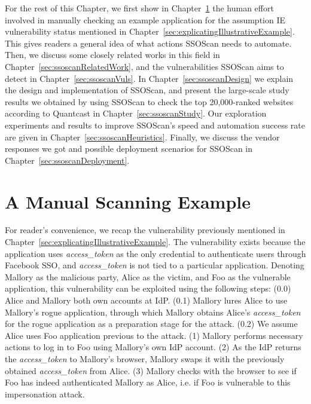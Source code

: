 For the rest of this Chapter, we first show in Chapter~\ref{sec:ssoscanManualExample} the human effort involved in manually checking an example application for the assumption IE vulnerability status mentioned in Chapter~\ref{sec:explicatingIllustrativeExample}.  This gives readers a general idea of what actions SSOScan needs to automate.  Then, we discuss some closely related works in this field in Chapter~\ref{sec:ssoscanRelatedWork}, and the vulnerabilities SSOScan aims to detect in Chapter~\ref{sec:ssoscanVuls}.  In Chapter~\ref{sec:ssoscanDesign} we explain the design and implementation of SSOScan, and present the large-scale study results we obtained by using SSOScan to check the top 20,000-ranked websites according to Quantcast in Chapter~\ref{sec:ssoscanStudy}.  Our exploration experiments and results to improve SSOScan's speed and automation success rate are given in Chapter~\ref{sec:ssoscanHeuristics}.  Finally, we discuss the vendor responses we got and possible deployment scenarios for SSOScan in Chapter~\ref{sec:ssoscanDeployment}.

\section{A Manual Scanning Example}
\label{sec:ssoscanManualExample}

For reader's convenience, we recap the vulnerability previously mentioned in Chapter~\ref{sec:explicatingIllustrativeExample}.  The vulnerability exists because the application uses \emph{access\_token} as the only credential to authenticate users through Facebook SSO, and \emph{access\_token} is not tied to a particular application.  Denoting Mallory as the malicious party, Alice as the victim, and Foo as the vulnerable application, this vulnerability can be exploited using the following steps:  (0.0) Alice and Mallory both own accounts at IdP.  (0.1) Mallory lures Alice to use Mallory's rogue application, through which Mallory obtains Alice's \emph{access\_token} for the rogue application as a preparation stage for the attack.  (0.2) We assume Alice uses Foo application previous to the attack.  (1) Mallory performs necessary actions to log in to Foo using Mallory's own IdP account.  (2) As the IdP returns the \emph{access\_token} to Mallory's browser, Mallory swaps it with the previously obtained \emph{access\_token} from Alice.  (3) 
Mallory checks with the browser to see if Foo has indeed authenticated Mallory as Alice, i.e. if Foo is vulnerable to this impersonation attack.

